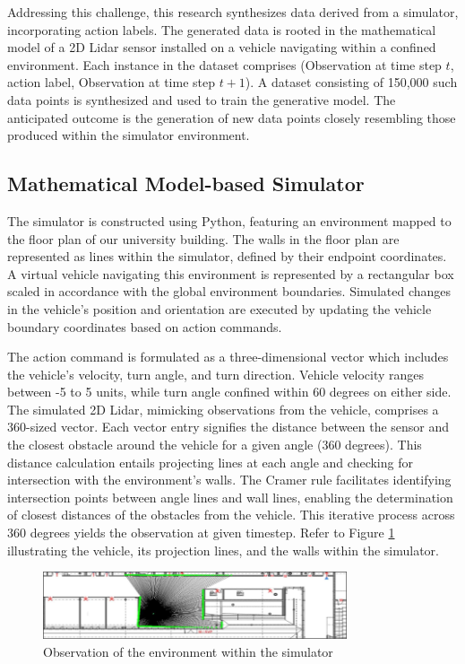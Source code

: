 \documentclass[12pt,twoside,a4paper,parskip]{scrbook} %
\begin{document}
Addressing this challenge, this research synthesizes data derived from a simulator, incorporating action labels. The generated data is rooted in the mathematical model of a 2D Lidar sensor installed on a vehicle navigating within a confined environment. Each instance in the dataset comprises (Observation at time step \(t\), action label, Observation at time step \(t+1\)). A dataset consisting of 150,000 such data points is synthesized and used to train the generative model. The anticipated outcome is the generation of new data points closely resembling those produced within the simulator environment.

\subsection{Mathematical Model-based Simulator}

The simulator is constructed using Python, featuring an environment mapped to the floor plan of our university building. The walls in the floor plan are represented as lines within the simulator, defined by their endpoint coordinates. A virtual vehicle navigating this environment is represented by a rectangular box scaled in accordance with the global environment boundaries. Simulated changes in the vehicle's position and orientation are executed by updating the vehicle boundary coordinates based on action commands.

The action command is formulated as a three-dimensional vector which includes the vehicle's velocity, turn angle, and turn direction. Vehicle velocity ranges between -5 to 5 units, while turn angle confined within 60 degrees on either side. The simulated 2D Lidar, mimicking observations from the vehicle, comprises a 360-sized vector. Each vector entry signifies the distance between the sensor and the closest obstacle around the vehicle for a given angle (360 degrees). This distance calculation entails projecting lines at each angle and checking for intersection with the environment's walls. The Cramer rule facilitates identifying intersection points between angle lines and wall lines, enabling the determination of closest distances of the obstacles from the vehicle. This iterative process across 360 degrees yields the observation at given timestep. Refer to Figure \ref{fig:simu} illustrating the vehicle, its projection lines, and the walls within the simulator. 
\begin{figure}[h]
    \centering
    \includegraphics[width=0.80\textwidth]{Images/simu.png}
    \caption{Observation of the environment within the simulator}
    \label{fig:simu}
  \end{figure}
\end{document}
